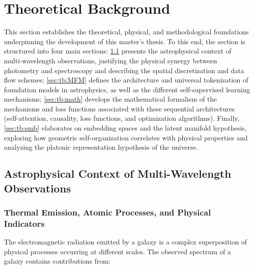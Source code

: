 
\section{Theoretical Background}

This section establishes the theoretical, physical, and methodological foundations underpinning the development of this master's thesis. To this end, the section is structured into four main sections: \cref{sec:tb:context} presents the astrophysical context of multi-wavelength observations, justifying the physical synergy between photometry and spectroscopy and describing the spatial discretization and data flow schemes; \cref{sec:tb:MFM} defines the architecture and universal tokenization of foundation models in astrophysics, as well as the different self-supervised learning mechanisms; \cref{sec:tb:math} develops the mathematical formalism of the mechanisms and loss functions associated with these sequential architectures (self-attention, causality, loss functions, and optimization algorithms). Finally, \cref{sec:tb:emb} elaborates on embedding spaces and the latent manifold hypothesis, exploring how geometric self-organization correlates with physical properties and analyzing the platonic representation hypothesis of the universe.

\subsection{Astrophysical Context of Multi-Wavelength Observations} \label{sec:tb:context}

\subsubsection{Thermal Emission, Atomic Processes, and Physical Indicators}

The electromagnetic radiation emitted by a galaxy is a complex superposition of physical processes occurring at different scales. The observed spectrum of a galaxy contains contributions from:

